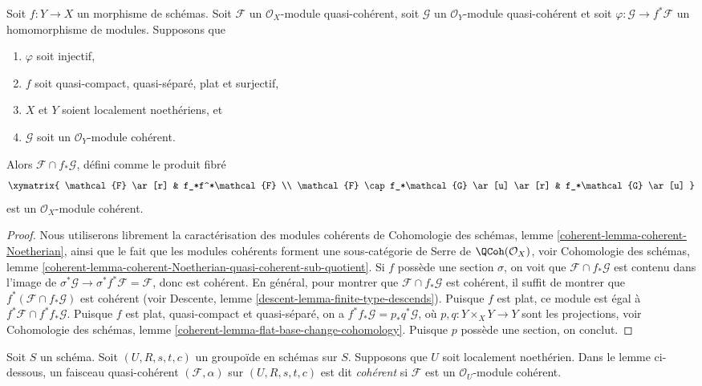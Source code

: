 \begin{lemma}
\label{lemma-push-pull}
Soit $f : Y \to X$ un morphisme de schémas. Soit $\mathcal{F}$
un $\mathcal{O}_X$-module quasi-cohérent, soit $\mathcal{G}$
un $\mathcal{O}_Y$-module quasi-cohérent et soit
$\varphi : \mathcal{G} \to f^*\mathcal{F}$ un homomorphisme de modules. Supposons que
\begin{enumerate}
\item $\varphi$ soit injectif,
\item $f$ soit quasi-compact, quasi-séparé, plat et surjectif,
\item $X$ et $Y$ soient localement noethériens, et
\item $\mathcal{G}$ soit un $\mathcal{O}_Y$-module cohérent.
\end{enumerate}
Alors $\mathcal{F} \cap f_*\mathcal{G}$, défini comme le produit fibré
$$
\xymatrix{
\mathcal{F} \ar[r] & f_*f^*\mathcal{F} \\
\mathcal{F} \cap f_*\mathcal{G} \ar[u] \ar[r] &
f_*\mathcal{G} \ar[u]
}
$$
est un $\mathcal{O}_X$-module cohérent.
\end{lemma}

\begin{proof}
Nous utiliserons librement la caractérisation des modules cohérents de
Cohomologie des schémas, lemme \ref{coherent-lemma-coherent-Noetherian},
ainsi que le fait que les modules cohérents forment une sous-catégorie de Serre
de $\QCoh(\mathcal{O}_X)$, voir
Cohomologie des schémas,
lemme \ref{coherent-lemma-coherent-Noetherian-quasi-coherent-sub-quotient}.
Si $f$ possède une section $\sigma$, on voit que
$\mathcal{F} \cap f_*\mathcal{G}$ est contenu dans l'image de
$\sigma^*\mathcal{G} \to \sigma^*f^*\mathcal{F} = \mathcal{F}$,
donc est cohérent. En général, pour montrer que $\mathcal{F} \cap f_*\mathcal{G}$
est cohérent, il suffit de montrer que
$f^*(\mathcal{F} \cap f_*\mathcal{G})$ est cohérent (voir
Descente, lemme \ref{descent-lemma-finite-type-descends}).
Puisque $f$ est plat, ce module est égal à $f^*\mathcal{F} \cap f^*f_*\mathcal{G}$.
Puisque $f$ est plat, quasi-compact et quasi-séparé, on a
$f^*f_*\mathcal{G} = p_*q^*\mathcal{G}$, où $p, q : Y \times_X Y \to Y$
sont les projections, voir
Cohomologie des schémas, lemme \ref{coherent-lemma-flat-base-change-cohomology}.
Puisque $p$ possède une section, on conclut.
\end{proof}

\noindent
Soit $S$ un schéma. Soit $(U, R, s, t, c)$ un groupoïde en schémas sur $S$.
Supposons que $U$ soit localement noethérien. Dans le lemme ci-dessous, un
faisceau quasi-cohérent $(\mathcal{F}, \alpha)$ sur $(U, R, s, t, c)$ est dit
{\it cohérent} si $\mathcal{F}$ est un $\mathcal{O}_U$-module cohérent.


